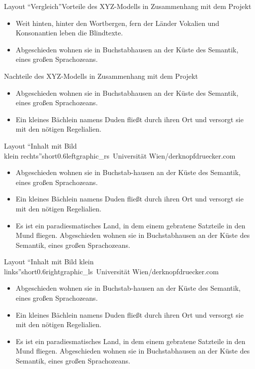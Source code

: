 \documentclass[hyperref={pdfpagelabels=false}, aspectratio=43, t]{beamer}  %
\begin{document}
\begin{textFrame2}{Layout ``Vergleich''}{Vorteile des XYZ-Modells in Zusammenhang mit dem Projekt}%
{
		\begin{itemize}
			\item Weit hinten, hinter den Wortbergen, fern der Länder Vokalien und Konsonantien leben die Blindtexte.
			\item Abgeschieden wohnen sie in Buchstabhausen an der Küste des Semantik, eines großen Sprachozeans. 
		\end{itemize}
}{}{Nachteile des XYZ-Modells in Zusammenhang mit dem Projekt}{
		\begin{itemize}
			\item Abgeschieden wohnen sie in Buchstabhausen an der Küste des Semantik, eines großen Sprachozeans.
			\item Ein kleines Bächlein namens Duden fließt durch ihren Ort und versorgt sie mit den nötigen Regelialien. 
		\end{itemize}
}{}
\end{textFrame2}

\begin{graphicsFrame}{Layout ``Inhalt mit Bild \\ klein rechts''}{short}{0.6}{left}{graphic_rs}{\textcopyright~Universität Wien/derknopfdruecker.com}

		\begin{itemize}
			\item Abgeschieden wohnen sie in Buchstab-hausen an der Küste des Semantik, eines großen Sprachozeans.
			\item Ein kleines Bächlein namens Duden fließt durch ihren Ort und versorgt sie mit den nötigen Regelialien.
			\item Es ist ein paradiesmatisches Land, in dem einem gebratene Satzteile in den Mund fliegen. Abgeschieden wohnen sie in Buchstabhausen an der Küste des Semantik, eines großen Sprachozeans. 
		\end{itemize}

\end{graphicsFrame}

\begin{graphicsFrame}{Layout ``Inhalt mit Bild klein \\ links''}{short}{0.6}{right}{graphic_ls}{\textcopyright~Universität Wien/derknopfdruecker.com}

		\begin{itemize}
			\item Abgeschieden wohnen sie in Buchstab-hausen an der Küste des Semantik, eines großen Sprachozeans.
			\item Ein kleines Bächlein namens Duden fließt durch ihren Ort und versorgt sie mit den nötigen Regelialien.
			\item Es ist ein paradiesmatisches Land, in dem einem gebratene Satzteile in den Mund fliegen. Abgeschieden wohnen sie in Buchstabhausen an der Küste des Semantik, eines großen Sprachozeans.
		\end{itemize}

\end{graphicsFrame}
\end{document}

